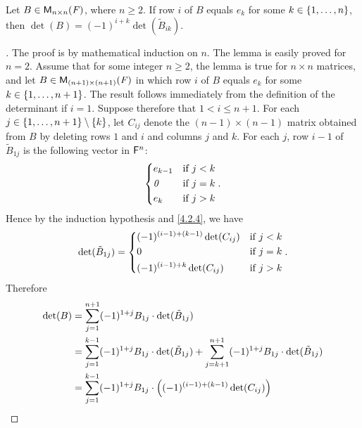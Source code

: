 \begin{lem}\label{4.2.5}
	Let \(B \in \mathsf{M}_{{n} \times n}({\mathit{F}})\), where \(n \geq 2\).
	If row \(i\) of \(B\) equals \(e_k\) for some \(k \in \left\lbrace1, \dots, n\right\rbrace\), then \(\det(B) = (-1)^{i + k} \det(\tilde{B}_{i k})\).
\end{lem}

\begin{proof}[]
	The proof is by mathematical induction on \(n\).
	The lemma is easily proved for \(n = 2\).
	Assume that for some integer \(n \geq 2\), the lemma is true for \(n \times n\) matrices, and let \(B \in \mathsf{M}_{{(n + 1)} \times (n + 1)}({\mathit{F}})\) in which row \(i\) of \(B\) equals \(e_k\) for some \(k \in \left\lbrace1, \dots, n + 1\right\rbrace\).
	The result follows immediately from the definition of the determinant if \(i = 1\).
	Suppose therefore that \(1 < i \leq n + 1\).
	For each \(j \in \left\lbrace1, \dots, n + 1\right\rbrace \setminus \left\lbrace k\right\rbrace\), let \(C_{i j}\) denote the \((n - 1) \times (n - 1)\) matrix obtained from \(B\) by deleting rows \(1\) and \(i\) and columns \(j\) and \(k\).
	For each \(j\), row \(i - 1\) of \(\tilde{B}_{1 j}\) is the following vector in \(\mathsf{F}^n\):
	\[
		\begin{dcases}
			e_{k - 1} & \text{if } j < k \\
			\mathit{0}       & \text{if } j = k \\
			e_k       & \text{if } j > k
		\end{dcases}.
	\]
	Hence by the induction hypothesis and \cref{4.2.4}, we have
	\[
		\det(\tilde{B}_{1 j}) = \begin{dcases}
			(-1)^{(i - 1) + (k - 1)} \det(C_{i j}) & \text{if } j < k \\
			0                                      & \text{if } j = k \\
			(-1)^{(i - 1) + k} \det(C_{i j})       & \text{if } j > k
		\end{dcases}.
	\]
	Therefore
	\begin{align*}
		\det(B) & = \sum_{j = 1}^{n + 1} (-1)^{1 + j} B_{1 j} \cdot \det(\tilde{B}_{1 j})                                                                                      \\
		        & = \sum_{j = 1}^{k - 1} (-1)^{1 + j} B_{1 j} \cdot \det(\tilde{B}_{1 j}) + \sum_{j = k + 1}^{n + 1} (-1)^{1 + j} B_{1 j} \cdot \det(\tilde{B}_{1 j})          \\
		        & = \sum_{j = 1}^{k - 1} (-1)^{1 + j} B_{1 j} \cdot \pa{(-1)^{(i - 1) + (k - 1)} \det(C_{i j})}                                                                \\

\end{align*}
\end{proof}
